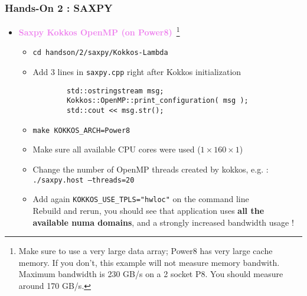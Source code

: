 \begin{frame}[fragile=singleslide]
  \frametitle{Hands-On 2 : SAXPY}

  \begin{itemize}
  \item \textcolor{violet}{\textbf{Saxpy Kokkos OpenMP (on Power8)}}~\footnote{Make sure to use a very large data array; Power8 has very large cache memory. If you don't, this example will not measure memory bandwith. Maximum bandwidth is 230 GB/s on a 2 socket P8. You should measure around 170 GB/s.}
    \begin{itemize}
    \item \texttt{cd handson/2/saxpy/Kokkos-Lambda}
    \item Add 3 lines in \texttt{saxpy.cpp} right after Kokkos initialization
      \begin{verbatim}
        std::ostringstream msg;
        Kokkos::OpenMP::print_configuration( msg );
        std::cout << msg.str();
      \end{verbatim}
    \item \texttt{make KOKKOS\_ARCH=Power8}
    \item Make sure all available CPU cores were used ($1\times 160 \times 1$)
    \item Change the number of OpenMP threads created by kokkos, e.g. :\\
      \texttt{./saxpy.host  --threads=20}
    \item Add again \texttt{KOKKOS\_USE\_TPLS="hwloc"} on the command line\\
      Rebuild and rerun, you should see that application uses \textbf{all the available numa domains}, and a strongly increased bandwidth usage !
    \end{itemize}
  \end{itemize}

\end{frame}

